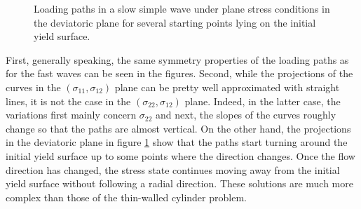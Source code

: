 \begin{figure}[h!]
  \centering
  
  \caption{Loading paths in a slow simple wave under plane stress conditions in the deviatoric plane for several starting points lying on the initial yield surface.}
  \label{fig:CP_slow_dev1}
\end{figure}


First, generally speaking, the same symmetry properties of the loading paths as for the fast waves can be seen in the figures.
Second, while the projections of the curves in the $(\sigma_{11},\sigma_{12})$ plane can be pretty well approximated with straight lines, it is not the case in the $(\sigma_{22},\sigma_{12})$ plane.
Indeed, in the latter case, the variations first mainly concern $\sigma_{22}$ and next, the slopes of the curves roughly change so that the paths are almost vertical.
On the other hand, the projections in the deviatoric plane in figure \ref{fig:CP_slow_dev1} show that the paths start turning around the initial yield surface up to some points where the direction changes.
Once the flow direction has changed, the stress state continues moving away from the initial yield surface without following a radial direction.
These solutions are much more complex than those of the thin-walled cylinder problem.

